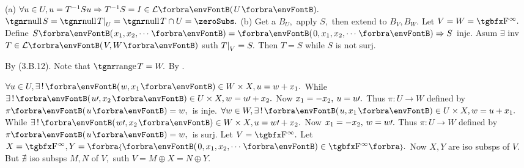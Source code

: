 
(a) $\forall u\in U,u=T^{-1}Su\Rightarrow T^{-1}S=I\in\Lm{U}.$ \Or $\null S=\null T\mmid_U=\null T\cap U=\zeroSubs.$\parSol{}
(b) Get a $B_U,$ apply $S,$ then extend to $B_V,B_W.$\PfEnd\vspace{2pt}
\AExa Let $V=W=\FbbP{\infty}.$ Define $S\Par{x_1,x_2,\cdots}=\Par{0,x_1,x_2,\cdots}\Rightarrow S$ inje.\parExa
Asum $\exists$ inv $T\in\Lm{V,W}$ suth $T\text{\normalsize|}_V=S.$ Then $T=S$ while $S$ is not surj.\SepLine

By (3.B.12). Note that $\range T=W.$ \; \Or {} \;By .\PfEnd\vspace{-2pt}
\SepLine

$\forall u\in U,\exists\,!\,\Par{w,x_1}\in W\times X,u=w+x_1.$ While $\exists\,!\,\Par{u\apostrophe,x_2}\in U\times X,w=u\apostrophe+x_2.$\parSol{}
Now $x_1=-x_2,\:u=u\prime.$ Thus $\pi:U\rightarrow W$ defined by $\pi\Par{u}=w,$ \,is inje.\parSol{\vspace{3pt}}
$\forall w\in W,\exists\,!\,\Par{u,x_1}\in U\times X,w=u+x_1.$ While $\exists\,!\,\Par{w\apostrophe,x_2}\in W\times X,u=w\apostrophe+x_2.$\parSol{}
Now $x_1=-x_2,\:w=w\prime.$ Thus $\pi:U\rightarrow W$ defined by $\pi\Par{u}=w,$ \,is surj.\PfEnd\vspace{4pt}
\AComm Let $V=\FbbP{\infty}.$ Let $X=\FbbP{\infty},Y=\Bra{\Par{0,x_1,x_2,\cdots}\in\FbbP{\infty}}.$ Now $X,Y$ are iso subsps of $V.$\parCom
But $\nexists$ iso subsps $M,N$ of $V,$ suth $V=M\oplus X=N\oplus Y.$
\SepLine


